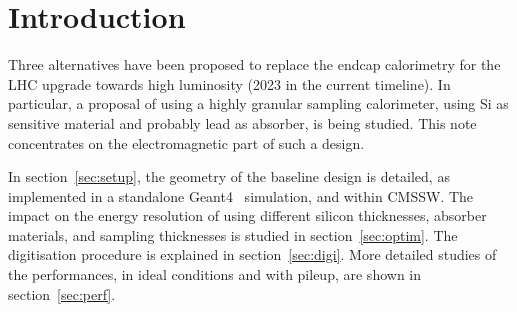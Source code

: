\section{Introduction}
\label{sec:intro}

Three alternatives have been proposed to replace the endcap
calorimetry for the LHC upgrade towards high luminosity (2023 in the
current timeline). In particular, a proposal of using a highly
granular sampling calorimeter, using Si as sensitive material and
probably lead as absorber, is being studied. This note concentrates on
the electromagnetic part of such a design.

In section~\ref{sec:setup}, the geometry of the baseline design is
detailed, as implemented in a standalone Geant4~\cite{Geant4}
simulation, and within CMSSW. The impact on the energy resolution of
using different silicon thicknesses, absorber materials, and sampling
thicknesses is studied in section~\ref{sec:optim}. The digitisation
procedure is explained in section~\ref{sec:digi}. More detailed
studies of the performances, in ideal conditions and with pileup, are
shown in section~\ref{sec:perf}.
